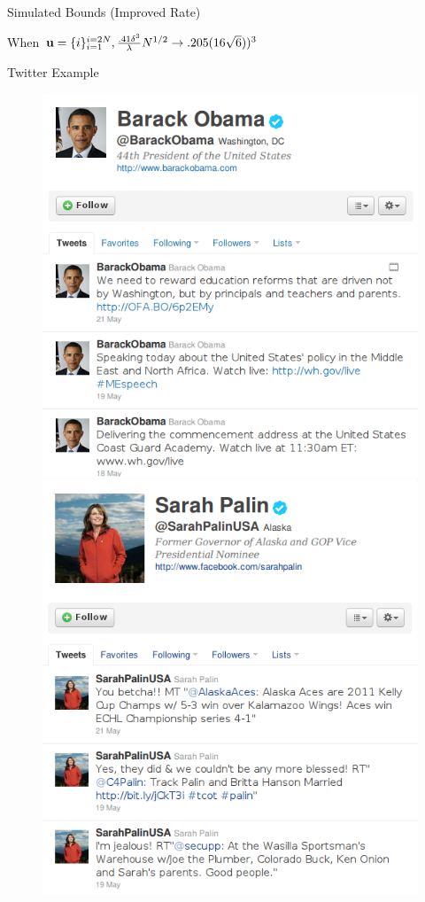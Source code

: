 \documentclass{beamer}
\begin{document}
\begin{frame}{Simulated Bounds (Improved Rate)}
  \begin{center}
    \resizebox{10.0cm}{!}{
      
    }
  \end{center}
  \pause
  When ${\bf u} = \{i\}_{i=1}^{i=2N}, \frac{.41 \delta^3}{\lambda}N^{1/2} \to .205(16\sqrt{6}))^3$
\end{frame}

\begin{frame}{Twitter Example}
  \begin{figure}[!ht]
   \centering
   \includegraphics[scale=.3]{pres3.png}
   \includegraphics[scale=.3]{pres4.png}

\end{figure}
\end{frame}
\end{document}
